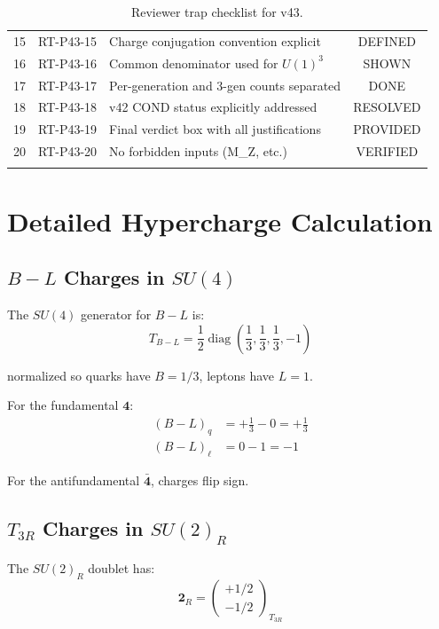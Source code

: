 \documentclass[11pt,a4paper]{article}
\DeclareMathOperator{\diag}{diag}
\begin{document}
\begin{longtable}{clp{8cm}c}
15 & RT-P43-15 & Charge conjugation convention explicit & \textcolor{green!60!black}{DEFINED} \\
16 & RT-P43-16 & Common denominator used for $U(1)^3$ & \textcolor{green!60!black}{SHOWN} \\
17 & RT-P43-17 & Per-generation and 3-gen counts separated & \textcolor{green!60!black}{DONE} \\
18 & RT-P43-18 & v42 COND status explicitly addressed & \textcolor{green!60!black}{RESOLVED} \\
19 & RT-P43-19 & Final verdict box with all justifications & \textcolor{green!60!black}{PROVIDED} \\
20 & RT-P43-20 & No forbidden inputs (M_Z, etc.) & \textcolor{green!60!black}{VERIFIED} \\
\bottomrule
\caption{Reviewer trap checklist for v43.}
\label{tab:trap-checklist}
\end{longtable}

\section{Detailed Hypercharge Calculation}
\label{app:hypercharge}

\subsection{$B-L$ Charges in $SU(4)$}

The $SU(4)$ generator for $B-L$ is:
\begin{equation}
\label{eq:BL-generator}
T_{B-L} = \frac{1}{2}\diag\left(\frac{1}{3}, \frac{1}{3}, \frac{1}{3}, -1\right)
\end{equation}

normalized so quarks have $B = 1/3$, leptons have $L = 1$.

For the fundamental $\mathbf{4}$:
\begin{align}
\label{eq:BL-4-quarks}
(B-L)_q &= +\frac{1}{3} - 0 = +\frac{1}{3} \\
\label{eq:BL-4-lepton}
(B-L)_\ell &= 0 - 1 = -1
\end{align}

For the antifundamental $\bar{\mathbf{4}}$, charges flip sign.

\subsection{$T_{3R}$ Charges in $SU(2)_R$}

The $SU(2)_R$ doublet has:
\begin{equation}
\label{eq:T3R-doublet}
\mathbf{2}_R = \begin{pmatrix} +1/2 \\ -1/2 \end{pmatrix}_{T_{3R}}
\end{equation}
\end{document}
